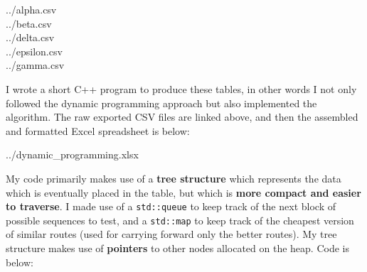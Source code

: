 \documentclass[
]{article}
\begin{document}
../alpha.csv\\
../beta.csv\\
../delta.csv\\
../epsilon.csv\\
../gamma.csv

I wrote a short C++ program to produce these tables, in other words I
not only followed the dynamic programming approach but also implemented
the algorithm. The raw exported CSV files are linked above, and then the
assembled and formatted Excel spreadsheet is below:

../dynamic\_programming.xlsx

My code primarily makes use of a \textbf{tree structure} which
represents the data which is eventually placed in the table, but which
is \textbf{more compact and easier to traverse}. I made use of a
\texttt{std::queue} to keep track of the next block of possible
sequences to test, and a \texttt{std::map} to keep track of the cheapest
version of similar routes (used for carrying forward only the better
routes). My tree structure makes use of \textbf{pointers} to other nodes
allocated on the heap. Code is below:
\end{document}
